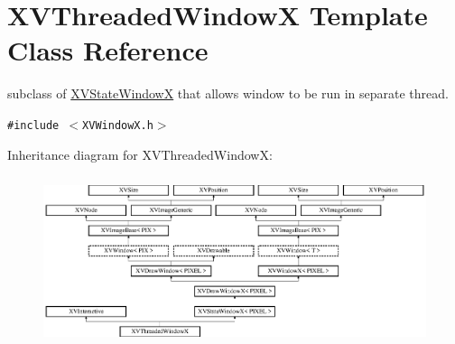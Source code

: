 \hypertarget{class_XVThreadedWindowX}{
\section{XVThreaded\-Window\-X  Template Class Reference}
\label{XVThreadedWindowX}
}
subclass of \hyperlink{class_XVStateWindowX}{XVState\-Window\-X} that allows window to be run in separate thread. 


{\tt \#include $<$XVWindow\-X.h$>$}

Inheritance diagram for XVThreaded\-Window\-X:\begin{figure}[H]
\begin{center}
\leavevmode
\includegraphics[height=4.97778cm]{class_XVThreadedWindowX}
\end{center}
\end{figure}
